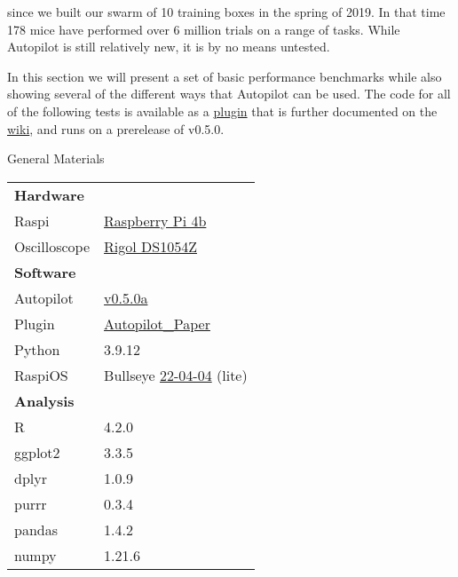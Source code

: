 
 since we built our swarm of 10 training boxes in the spring of 2019. In that time 178 mice have performed over 6 million trials on a range of tasks. While Autopilot is still relatively new, it is by no means untested.

In this section we will present a set of basic performance benchmarks while also showing several of the different ways that Autopilot can be used. The code for all of the following tests is available as a \href{https://github.com/auto-pi-lot/plugin-paper}{plugin} that is further documented on the \href{https://wiki.auto-pi-lot.com/index.php/Plugin:Autopilot_Paper}{wiki}, and runs on a prerelease of v0.5.0. 

\begin{margintable}[-0.5cm]
\caption{General Materials}
\label{tab:materials}
\noindent\begin{tabularx}{\linewidth}{lX}%
\toprule
\textbf{Hardware} & \\
Raspi & \href{https://www.raspberrypi.org/products/raspberry-pi-4-model-b/}{Raspberry Pi 4b}\\
Oscilloscope & \href{https://wiki.auto-pi-lot.com/index.php/Rigol\_DS1054Z}{Rigol DS1054Z} \\
\midrule
\textbf{Software} & \\
Autopilot & \href{https://github.com/auto-pi-lot/autopilot/tree/v0.5.0a}{v0.5.0a} \\
Plugin & \href{https://wiki.auto-pi-lot.com/index.php/Plugin:Autopilot\_Paper}{Autopilot\_Paper} \\
Python & 3.9.12 \\
RaspiOS & Bullseye \href{https://downloads.raspberrypi.org/raspios_lite_armhf/images/raspios\_lite\_armhf-2022-04-07/}{22-04-04} (lite) \\
\midrule
\textbf{Analysis} & \\
R & 4.2.0 \\
ggplot2\citep{wickhamGgplot2ElegantGraphics2016a} & 3.3.5 \\
dplyr\citep{wickhamDplyrGrammarData2022} & 1.0.9 \\
purrr\citep{henryPurrrFunctionalProgramming2020} & 0.3.4 \\
pandas\citep{mckinneyPandasFoundationalPython2011} & 1.4.2 \\
numpy\citep{waltNumPyArrayStructure2011,harrisArrayProgrammingNumPy2020a} & 1.21.6 \\ 
\bottomrule
\end{tabularx}
\end{margintable}
